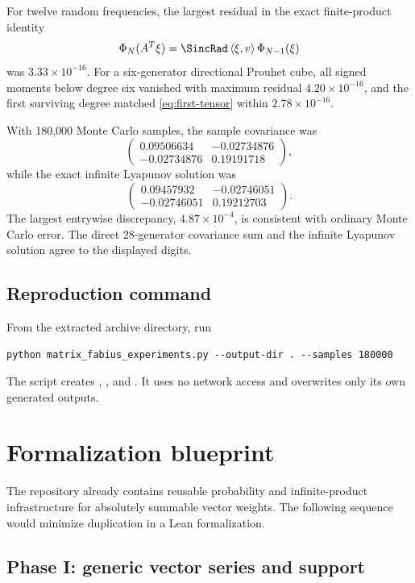 \documentclass[11pt,oneside]{article}
\theoremstyle{definition}
\theoremstyle{remark}
\newcommand{\ip}[2]{\left\langle #1,#2\right\rangle}
\begin{document}
For twelve random frequencies, the largest residual in the exact finite-product
identity
\[
 \Phi_N(A^T\xi)=\SincRad\ip{\xi}{v}\Phi_{N-1}(\xi)
\]
was $3.33\times10^{-16}$.  For a six-generator directional Prouhet cube, all
signed moments below degree six vanished with maximum residual
$4.20\times10^{-16}$, and the first surviving degree matched
\eqref{eq:first-tensor} within $2.78\times10^{-16}$.

With 180,000 Monte Carlo samples, the sample covariance was
\[
 \begin{pmatrix}
 0.09506634&-0.02734876\\
 -0.02734876&0.19191718
 \end{pmatrix},
\]
while the exact infinite Lyapunov solution was
\[
 \begin{pmatrix}
 0.09457932&-0.02746051\\
 -0.02746051&0.19212703
 \end{pmatrix}.
\]
The largest entrywise discrepancy, $4.87\times10^{-4}$, is consistent with
ordinary Monte Carlo error.  The direct $28$-generator covariance sum and the
infinite Lyapunov solution agree to the displayed digits.

\subsection{Reproduction command}

From the extracted archive directory, run
\begin{lstlisting}[style=pythonstyle]
python matrix_fabius_experiments.py --output-dir . --samples 180000
\end{lstlisting}
The script creates , , and .  It uses
no network access and overwrites only its own generated outputs.

\section{Formalization blueprint}
\label{sec:formalization}

The repository already contains reusable probability and infinite-product
infrastructure for absolutely summable vector weights.  The following sequence
would minimize duplication in a Lean formalization.

\subsection{Phase I: generic vector series and support}
\end{document}

